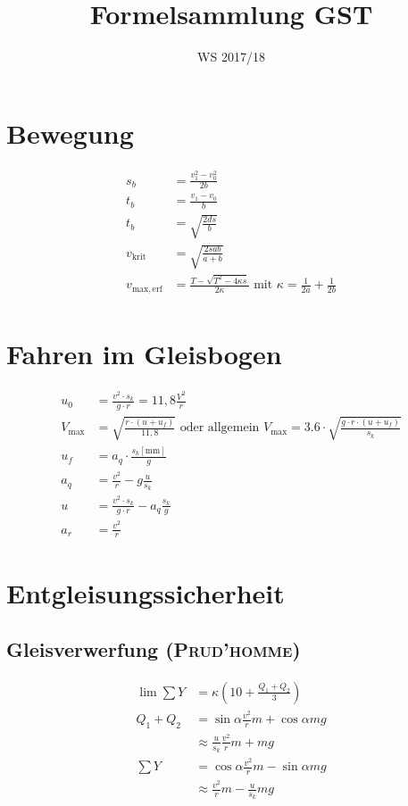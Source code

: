 \documentclass{scrartcl}
\title{Formelsammlung GST}
\date{WS 2017/18}
\begin{document}
	\maketitle
	\section{Bewegung}
	\begin{align*}
		s_b &= \frac{v_1^2 - v_0^2}{2b} \\
		t_b &= \frac{v_1 - v_0}{b} \\
		t_b &= \sqrt{\frac{2ds}{b}} \\
		v_\mathrm{krit} &= \sqrt{\frac{2sab}{a+b}} \\
		v_\mathrm{max,erf} &= \frac{T-\sqrt{T^2-4\kappa{}s}}{2\kappa} \text{ mit } \kappa = \frac{1}{2a}+\frac{1}{2b} \\
	\end{align*}

	\section{Fahren im Gleisbogen}
	\begin{align*}
		u_0 &= \frac{v^2 \cdot s_k}{g\cdot r} = 11,8\frac{V^2}{r} \\
		V_{\text{max}} &= \sqrt{\frac{r\cdot(u+u_f)}{11,8}} \text{ oder allgemein } V_{\text{max}} = 3.6 \cdot \sqrt{\frac{g\cdot r \cdot (u + u_f)}{s_k}} \\
		u_f &= a_q \cdot \frac{s_k[\mathrm{mm}]}{g} \\
		a_q &= \frac{v^2}{r} - g\frac{u}{s_k} \\
		u &= \frac{v^2 \cdot s_k}{g\cdot r} - a_q\frac{s_k}{g} \\
		a_r &= \frac{v^2}{r}
	\end{align*}

	\section{Entgleisungssicherheit}
	\subsection{Gleisverwerfung (\textsc{Prud'homme})}
	\begin{align*}
		\lim\sum{}Y &= \kappa\left(10+\frac{Q_1+Q_2}{3}\right) \\
		Q_1+Q_2 &= \sin\alpha\frac{v^2}{r}m+\cos\alpha{}mg \\
						&\approx \frac{u}{s_k}\frac{v^2}{r}m+mg \\
		\sum{}Y &= \cos\alpha\frac{v^2}{r}m-\sin\alpha{}mg \\
						&\approx \frac{v^2}{r}m - \frac{u}{s_k}mg
	\end{align*}
\end{document}
